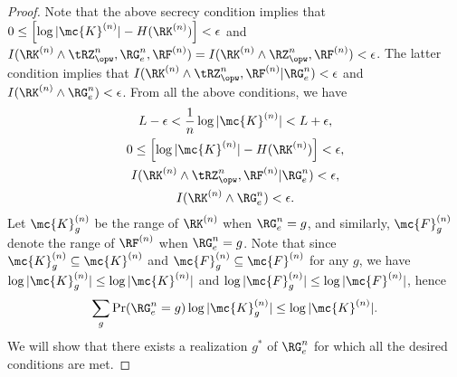 \begin{proof}
Note that the above secrecy  condition implies that $0\leq\left[\log|\mc{K}^{(n)}|-H(\RK^{(n)})\right] < \epsilon$ and  $I(\RK^{(n)}\wedge\tRZ^n_{\opw},\RG^n_e,\RF^{(n)})=I(\RK^{(n)}\wedge\RZ^n_{\opw},\RF^{(n)})<  \epsilon$. The latter condition implies that $I(\RK^{(n)}\wedge\tRZ^n_{\opw},\RF^{(n)}|\RG^n_e)<  \epsilon$ and $I(\RK^{(n)}\wedge \RG^n_e)<  \epsilon$. From all the above conditions, we have
\begin{gather}
L-\epsilon <\frac{1}{n}\log|\mc{K}^{(n)}| < L+\epsilon,\label{eq:rate1}\\
    0\leq\left[\log|\mc{K}^{(n)}|-H(\RK^{(n)})\right] < \epsilon,\label{eq:rate2}\\
    I(\RK^{(n)}\wedge\tRZ^n_{\opw},\RF^{(n)}|\RG^n_e)<  \epsilon,\label{eq:rate3}\\ I(\RK^{(n)}\wedge \RG^n_e)<  \epsilon.\label{eq:rate4}
\end{gather}
Let $\mc{K}^{(n)}_g$ be the range of $\RK^{(n)}$ when $\RG_e^n=g$, and similarly, $\mc{F}^{(n)}_g$ denote the range of $\RF^{(n)}$ when $\RG_e^n=g$. Note that since $\mc{K}^{(n)}_g \subseteq \mc{K}^{(n)}$ and $\mc{F}^{(n)}_g \subseteq \mc{F}^{(n)}$ for any $g$, we have $\log|\mc{K}^{(n)}_g|\leq \log|\mc{K}^{(n)}|$ and $\log|\mc{F}^{(n)}_g|\leq \log|\mc{F}^{(n)}|$, hence
\begin{gather}
    \sum_{g}\Pr(\RG_e^n=g)\log|\mc{K}^{(n)}_g|\leq  \log|\mc{K}^{(n)}|.\label{eq:rate5}
\end{gather}
We will show that there exists a realization $g^{*}$ of $\RG_e^n$ for which all the desired conditions are met.


\end{proof}
